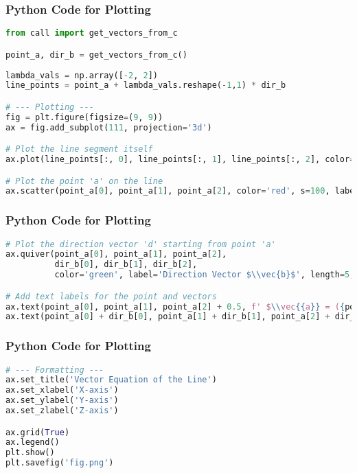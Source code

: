 \documentclass{beamer}
\theoremstyle{remark}
\let\vec\mathbf
\numberwithin{equation}{section}
\begin{document}
\begin{frame}[fragile]
\frametitle{Python Code for Plotting}
\begin{lstlisting}[language=Python]
from call import get_vectors_from_c

point_a, dir_b = get_vectors_from_c()
 
lambda_vals = np.array([-2, 2])
line_points = point_a + lambda_vals.reshape(-1,1) * dir_b

# --- Plotting ---
fig = plt.figure(figsize=(9, 9))
ax = fig.add_subplot(111, projection='3d')

# Plot the line segment itself
ax.plot(line_points[:, 0], line_points[:, 1], line_points[:, 2], color='blue', label='The Line')

# Plot the point 'a' on the line
ax.scatter(point_a[0], point_a[1], point_a[2], color='red', s=100, label='Point $\\vec{a}$')

\end{lstlisting}
\end{frame}

\begin{frame}[fragile]
\frametitle{Python Code for Plotting}
\begin{lstlisting}[language=Python]
  # Plot the direction vector 'd' starting from point 'a'
ax.quiver(point_a[0], point_a[1], point_a[2], 
          dir_b[0], dir_b[1], dir_b[2], 
          color='green', label='Direction Vector $\\vec{b}$', length=5, arrow_length_ratio=0.3)

# Add text labels for the point and vectors
ax.text(point_a[0], point_a[1], point_a[2] + 0.5, f' $\\vec{{a}} = ({point_a[0]:.0f}, {point_a[1]:.0f}, {point_a[2]:.0f})$')
ax.text(point_a[0] + dir_b[0], point_a[1] + dir_b[1], point_a[2] + dir_b[2], ' $\\vec{b}$')
\end{lstlisting}
\end{frame}

\begin{frame}[fragile]
\frametitle{Python Code for Plotting}
\begin{lstlisting}[language=Python]
# --- Formatting ---
ax.set_title('Vector Equation of the Line')
ax.set_xlabel('X-axis')
ax.set_ylabel('Y-axis')
ax.set_zlabel('Z-axis')

ax.grid(True)
ax.legend()
plt.show()
plt.savefig('fig.png')
\end{lstlisting}
\end{frame}
\end{document}
